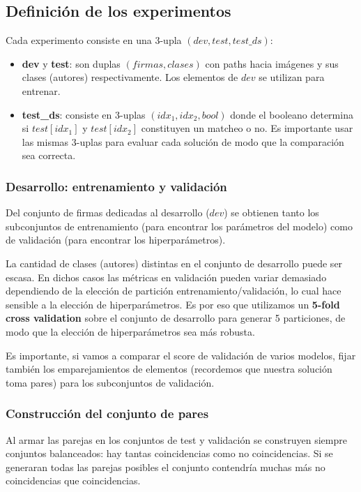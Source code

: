 \subsection{Definición de los experimentos}
\label{subsection:definicion-experimentos}

Cada experimento consiste en una 3-upla $(dev, test, test\_ds)$:
\begin{itemize}
    \item \textbf{dev} y \textbf{test}: son duplas $(firmas, clases)$ con paths hacia imágenes y sus clases (autores) respectivamente. Los elementos de $dev$ se utilizan para entrenar.
    \item \textbf{test\_ds}: consiste en 3-uplas $(idx_1, idx_2, bool)$ donde el booleano determina si $test[idx_1]$ y $test[idx_2]$ constituyen un matcheo o no. Es importante usar las mismas 3-uplas para evaluar cada solución de modo que la comparación sea correcta.
\end{itemize}

\subsubsection{Desarrollo: entrenamiento y validación}

Del conjunto de firmas dedicadas al desarrollo ($dev$) se obtienen tanto los subconjuntos de entrenamiento (para encontrar los parámetros del modelo) como de validación (para encontrar los hiperparámetros).

La cantidad de clases (autores) distintas en el conjunto de desarrollo puede ser escasa. En dichos casos las métricas en validación pueden variar demasiado dependiendo de la elección de partición entrenamiento/validación, lo cual hace sensible a la elección de hiperparámetros. Es por eso que utilizamos un \textbf{5-fold cross validation} sobre el conjunto de desarrollo para generar 5 particiones, de modo que la elección de hiperparámetros sea más robusta.

Es importante, si vamos a comparar el score de validación de varios modelos, fijar también los emparejamientos de elementos (recordemos que nuestra solución toma pares) para los subconjuntos de validación.

\subsubsection{Construcción del conjunto de pares}

Al armar las parejas en los conjuntos de test y validación se construyen siempre conjuntos balanceados: hay tantas coincidencias como no coincidencias. Si se generaran todas las parejas posibles el conjunto contendría muchas más no coincidencias que coincidencias.

